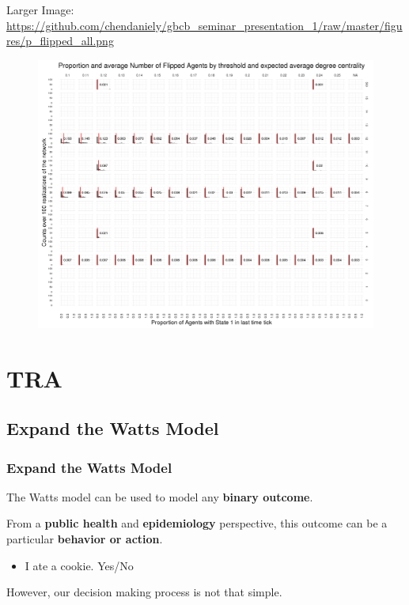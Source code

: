 \documentclass[compress]{beamer}
\begin{document}
        \begin{frame}[BlankLogo]
            Larger Image: \url{https://github.com/chendaniely/gbcb_seminar_presentation_1/raw/master/figures/p_flipped_all.png}
        \end{frame}
    
    \begin{frame}[BlankLogo]
        \begin{figure}
            \centering
            \includegraphics[width=0.75\linewidth]{../figures/p_flipped_all}
            \caption{}
            \label{fig:pflippedall}
        \end{figure}
    \end{frame}

\section{TRA}

\subsection{Expand the Watts Model}

    \begin{frame}[Basic2]\frametitle{Expand the Watts Model}
        The Watts model can be used to model any \textbf{binary outcome}.
        
        From a \textbf{public health} and \textbf{epidemiology} perspective,
        this outcome can be a particular \textbf{behavior or action}.
        \vspace{2mm}
        \begin{itemize}
            \item I ate a cookie.  Yes/No
        \end{itemize}
        
        \vspace{3mm}
        
        However, our decision making process is not that simple.
    \end{frame}
\end{document}
